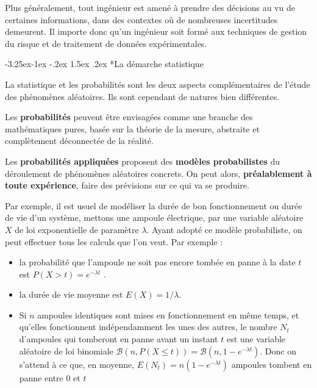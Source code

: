 \documentclass[]{book}
\makeatletter
\providecommand{\tightlist}{%
  \setlength{\itemsep}{0pt}\setlength{\parskip}{0pt}}
\renewcommand\subsection{\@startsection{subsection}{2}{\z@}%
                                     {-3.25ex\@plus -1ex \@minus -.2ex}%
                                     {1.5ex \@plus .2ex}%
                                     {\normalfont\large\bfseries\color{Violet}}}
\theoremstyle{magentacolor}
\theoremstyle{proprie}
\theoremstyle{exstyle}
\theoremstyle{exostyle}
\theoremstyle{definition}
\theoremstyle{definition}
\theoremstyle{definition}
\theoremstyle{remark}
\makeatother
\begin{document}
Plus généralement, tout ingénieur est amené à prendre des décisions au vu de certaines informations, dans des contextes où de nombreuses incertitudes demeurent. Il importe donc qu'un ingénieur soit formé aux techniques de gestion du risque et de traitement de données expérimentales.

\hypertarget{la-demarche-statistique}{%
\subsection*{La démarche statistique}\label{la-demarche-statistique}}

La statistique et les probabilités sont les deux aspects complémentaires de l'étude des phénomènes aléatoires. Ils sont cependant de natures bien différentes.

Les \textbf{probabilités} peuvent être envisagées comme une branche des mathématiques pures, basée sur la théorie de la mesure, abstraite et complètement déconnectée de la réalité.

Les \textbf{probabilités appliquées} proposent des \textbf{modèles probabilistes} du déroulement de phénomènes aléatoires concrets. On peut alors, \textbf{préalablement à toute expérience}, faire des prévisions sur ce qui va se produire.

Par exemple, il est usuel de modéliser la durée de bon fonctionnement ou durée de vie d'un système, mettons une ampoule électrique, par une variable aléatoire \(X\) de loi exponentielle de paramètre \(\lambda\). Ayant adopté ce modèle probabiliste, on peut effectuer tous les calculs que l'on veut. Par exemple :

\begin{itemize}
\tightlist
\item
  la probabilité que l'ampoule ne soit pas encore tombée en panne à la date \(t\) est \(P(X > t) = e^{−\lambda t}\) .
\item
  la durée de vie moyenne est \(E(X) = 1/\lambda\).
\item
  Si \(n\) ampoules identiques sont mises en fonctionnement en même temps, et qu'elles fonctionnent indépendamment les unes des autres, le nombre \(N_t\) d'ampoules qui tomberont en panne avant un instant \(t\) est une variable aléatoire de loi binomiale \(\mathcal{B}(n,P(X ≤ t)) = \mathcal{B}(n,1 − e^{-\lambda t})\). Donc on s'attend à ce que, en moyenne, \(E(N_t) = n(1 − e^{-\lambda t})\) ampoules tombent en panne entre 0 et \(t\)
\end{itemize}
\end{document}
